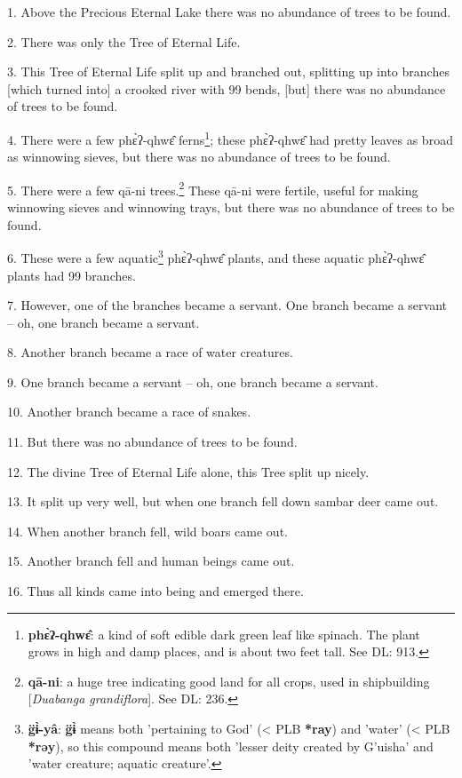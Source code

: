 \setcounter{footnote}{0}

1. Above the Precious Eternal Lake there was no abundance of trees to be found.

2. There was only the Tree of Eternal Life.

3. This Tree of Eternal Life split up and branched out, splitting up into branches
[which turned into] a crooked river with 99 bends, [but] there was no abundance
of trees to be found.

4. There were a few phɛ̀ʔ-qhwɛ̂ ferns\footnote{\textbf{phɛ̀ʔ-qhwɛ̂}: a kind of soft edible dark green leaf like spinach. The plant grows in high and damp places, and is about two feet tall. See DL: 913.}; these phɛ̀ʔ-qhwɛ̂ had pretty
leaves as broad as winnowing sieves, but there was no abundance of trees to be
found.

5. There were a few qā-ni trees.\footnote{\textbf{qā-ni}: a huge tree indicating good land for all crops, used in shipbuilding [\textit{Duabanga grandiflora}]. See DL: 236.} These qā-ni were fertile, useful for making
winnowing sieves and winnowing trays, but there was no abundance of trees to be
found.

6. These were a few aquatic\footnote{\textbf{g̈ɨ̀-yâ}: \textbf{g̈ɨ̀} means both 'pertaining to God' (< PLB \textbf{*ray}) and 'water' (< PLB \textbf{*rəy}), so this compound means both 'lesser deity created by G'uisha' and 'water creature; aquatic creature'.} phɛ̀ʔ-qhwɛ̂ plants, and these aquatic phɛ̀ʔ-qhwɛ̂
plants had 99 branches.

7. However, one of the branches became a servant. One branch became a servant --
oh, one branch became a servant.

8. Another branch became a race of water creatures.

9. One branch became a servant -- oh, one branch became a servant.

10. Another branch became a race of snakes.

11. But there was no abundance of trees to be found.

12. The divine Tree of Eternal Life alone, this Tree split up nicely.

13. It split up very well, but when one branch fell down sambar deer came out.

14. When another branch fell, wild boars came out.

15. Another branch fell and human beings came out.

16. Thus all kinds came into being and emerged there.


